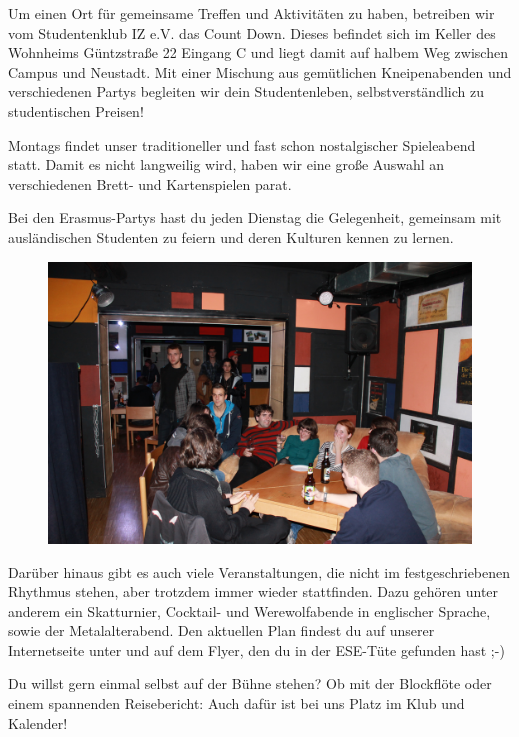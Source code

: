 Um einen Ort für gemeinsame Treffen und Aktivitäten zu haben, betreiben wir vom Studentenklub IZ e.V. das Count Down.
Dieses befindet sich im Keller des Wohnheims Güntzstraße 22 Eingang C und liegt damit auf halbem Weg zwischen Campus und Neustadt.
Mit einer Mischung aus gemütlichen Kneipenabenden und verschiedenen Partys begleiten wir dein Studentenleben, selbstverständlich zu studentischen Preisen!

Montags findet unser traditioneller und fast schon nostalgischer Spieleabend statt.
Damit es nicht langweilig wird, haben wir eine große Auswahl an verschiedenen Brett- und Kartenspielen parat.

Bei den Erasmus-Partys hast du jeden Dienstag die Gelegenheit, gemeinsam mit ausländischen Studenten zu feiern und deren Kulturen kennen zu lernen.

\begin{figure}%
  \vspace{-.4cm}
  \hspace{.03\linewidth}\includegraphics[width=.96\linewidth]{img/ese2013/cd.jpg}
  \vspace{-1cm}
\end{figure}

Darüber hinaus gibt es auch viele Veranstaltungen, die nicht im festgeschriebenen Rhythmus stehen, aber trotzdem immer wieder stattfinden.
Dazu gehören unter anderem ein Skatturnier, Cocktail- und Werewolfabende in englischer Sprache, sowie der Metalalterabend.
Den aktuellen Plan findest du auf unserer Internetseite unter  und auf dem Flyer, den du in der ESE-Tüte gefunden hast ;-)

Du willst gern einmal selbst auf der Bühne stehen?
Ob mit der Blockflöte oder einem spannenden Reisebericht:
Auch dafür ist bei uns Platz im Klub und Kalender!

